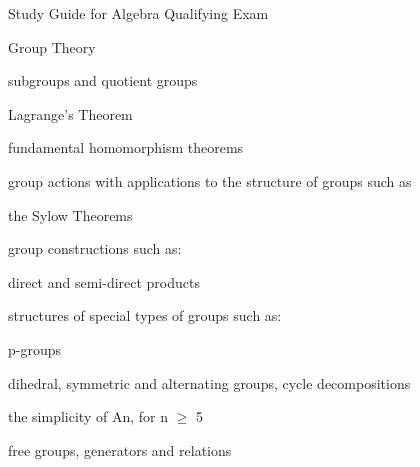 \documentclass[a4paper,portrait,12pt]{article}
\begin{document}
\begin{flushleft}
Study Guide for Algebra Qualifying Exam
\end{flushleft}


\begin{flushleft}
Group Theory
\end{flushleft}


\begin{flushleft}
subgroups and quotient groups
\end{flushleft}


\begin{flushleft}
Lagrange's Theorem
\end{flushleft}


\begin{flushleft}
fundamental homomorphism theorems
\end{flushleft}


\begin{flushleft}
group actions with applications to the structure of groups such as
\end{flushleft}


\begin{flushleft}
the Sylow Theorems
\end{flushleft}


\begin{flushleft}
group constructions such as:
\end{flushleft}


\begin{flushleft}
direct and semi-direct products
\end{flushleft}


\begin{flushleft}
structures of special types of groups such as:
\end{flushleft}


\begin{flushleft}
p-groups
\end{flushleft}


\begin{flushleft}
dihedral, symmetric and alternating groups, cycle decompositions
\end{flushleft}


\begin{flushleft}
the simplicity of An, for n $\geq$ 5
\end{flushleft}


\begin{flushleft}
free groups, generators and relations
\end{flushleft}
\end{document}
